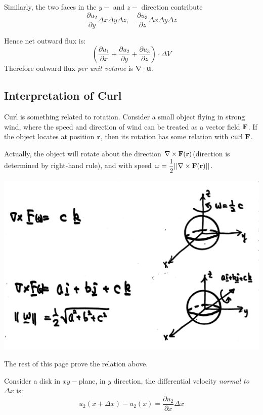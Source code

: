 \documentclass[11pt, a4paper]{MATH2023}
\newcommand{\rr}{{\bf r}}
\newcommand{\FF}{{\bf F}}
\newcommand{\curl}{{\rm curl\ }}
\newcommand{\pt}{\partial}
\begin{document}
\begin{spacing}{1.3}
    Similarly, the two faces in the $y-$ and $z-$ direction contribute 
    $$\frac{\pt u_2}{\pt y} \Delta x \Delta y \Delta z, \quad \frac{\pt u_3}{\pt z} \Delta x \Delta y \Delta z$$

    Hence net outward flux is: 
    $$\left(\frac{\pt u_1}{\pt x} + \frac{\pt u_2}{\pt y} + \frac{\pt u_3}{\pt z}\right)\cdot \Delta V$$
    Therefore outward flux {\it per unit volume} is $\nabla \cdot \uu$.



    \newpage
    \subsection{Interpretation of Curl}

    Curl is something related to rotation. Consider a small object flying in strong wind,
    where the speed and direction of wind can be treated as a vector field $\FF$. If the object 
    locates at position $\rr$, then its rotation has some relation with $\curl \FF$.

    Actually, the object will rotate about the direction $\nabla \times \FF(\rr)$(direction 
    is determined by right-hand rule), and with speed $\omega = \dfrac{1}{2} ||\nabla \times \FF(\rr)||$.
    \begin{center}
        \includegraphics[scale=0.13]{images/Ch15-curl-rotation.png}
    \end{center}

    {\blue The rest of this page prove the relation above.}

    Consider a disk in $xy-$plane, in $y$ direction, the differential velocity 
    {\it normal to }$\Delta x$ is: 
    $$u_2(x+\Delta x)-u_2(x)=\dfrac{\pt u_2}{\pt x}\Delta x$$
    \begin{center}
        \begin{tikzpicture}[x=0.75pt,y=0.75pt,yscale=-1,xscale=1]


\end{tikzpicture}
\end{center}
\end{spacing}
\end{document}
